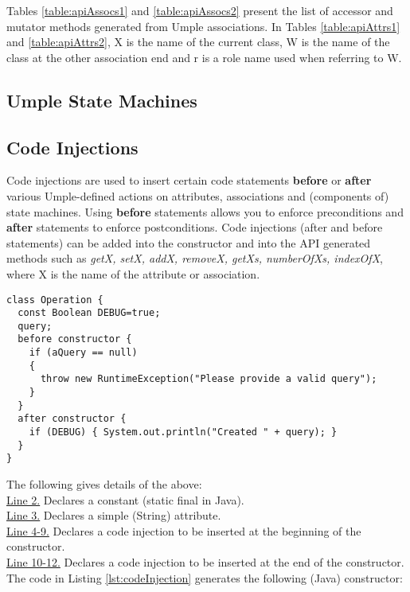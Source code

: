 Tables \ref{table:apiAssocs1} and \ref{table:apiAssocs2} present the list of accessor and mutator methods generated from Umple associations. In Tables \ref{table:apiAttrs1} and \ref{table:apiAttrs2}, X is the name of the current class, W is the name of the class at the other association end and r is a role name used when referring to W.

\subsection{Umple State Machines}

\subsection{Code Injections}
Code injections are used to insert certain code statements \textbf{before} or \textbf{after} various Umple-defined actions on attributes, associations and (components of) state machines. Using \textbf{before} statements allows you to enforce preconditions and \textbf{after} statements to enforce postconditions. Code injections (after and before statements) can be added into the constructor and into the API generated methods such as \textit{getX, setX, addX, removeX, getXs, numberOfXs, indexOfX}, where X is the name of the attribute or association.

\begin{lstlisting}[style=umpleOut,label={lst:codeInjection},caption=A code injection into the constructor]
class Operation {  
  const Boolean DEBUG=true;  
  query;  
  before constructor {  
    if (aQuery == null)  
    {  
      throw new RuntimeException("Please provide a valid query");  
    }  
  }  
  after constructor {  
    if (DEBUG) { System.out.println("Created " + query); }  
  }  
}  
\end{lstlisting}

The following gives details of the above:\\
\underline{Line 2.} Declares a constant (static final in Java).  \\
\underline{Line 3.} Declares a simple (String) attribute.   	 \\
\underline{Line 4-9.} Declares a code injection to be inserted at the beginning of the constructor.  \\
\underline{Line 10-12.} Declares a code injection to be inserted at the end of the constructor.      \\

The code in Listing \ref{lst:codeInjection} generates the following (Java) constructor:

